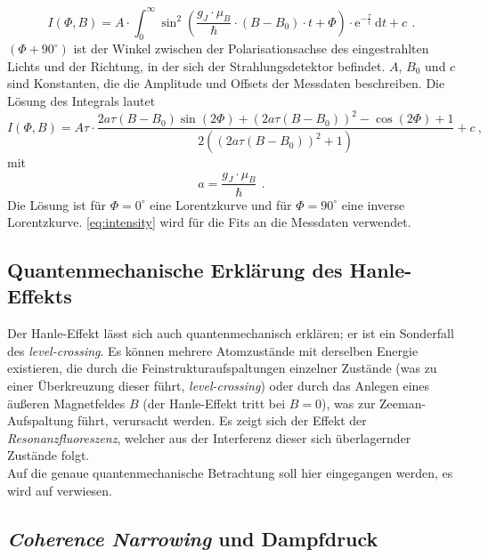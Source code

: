 \begin{equation}
\label{}
I(\Phi,B) = A \cdot \int_0^{\infty} \sin^2 \left( \frac{g_J \cdot \mu_B}{\hbar} \cdot (B-B_0) \cdot t + \Phi \right) \cdot
\text{e}^{-\frac{\tau}{t}} \ \text{d}t + c \, \ .
\end{equation}
$(\Phi + 90^{\circ})$ ist der Winkel zwischen der Polarisationsachse des eingestrahlten Lichts und der Richtung,
in der sich der Strahlungsdetektor befindet.
$A$, $B_0$ und $c$ sind Konstanten, die die Amplitude und Offsets der Messdaten beschreiben.
Die Lösung des Integrals lautet
\begin{equation}
\label{eq:intensity}
I(\Phi,B) = A \tau \cdot \frac{2 a \tau  (B-B_0) \sin (2 \Phi )+(2 a \tau  (B-B_0))^2-\cos (2 \Phi )+1}
{2 \left((2 a \tau  (B-B_0))^2+1\right)}+c \ ,
\end{equation}
mit
\begin{equation}
\label{}
a=\frac{g_J \cdot \mu_B}{\hbar} \, \ .
\end{equation}
Die Lösung ist für $\Phi=0^{\circ}$ eine Lorentzkurve und für $\Phi=90^{\circ}$ eine inverse Lorentzkurve.
\autoref{eq:intensity} wird für die Fits an die Messdaten verwendet.

\subsection{Quantenmechanische Erklärung des Hanle-Effekts}
Der Hanle-Effekt lässt sich auch quantenmechanisch erklären; er ist ein Sonderfall des \emph{level-crossing}. 
Es können mehrere Atomzustände mit derselben Energie existieren, die durch die Feinstrukturaufspaltungen einzelner Zustände (was zu einer Überkreuzung 
dieser führt, \emph{level-crossing}) oder durch das Anlegen eines äußeren Magnetfeldes $B$ (der Hanle-Effekt tritt bei $B=0$), was zur Zeeman-Aufspaltung 
führt, verursacht werden.
Es zeigt sich der Effekt der \emph{Resonanzfluoreszenz}, welcher aus der Interferenz dieser sich überlagernder Zustände folgt. \\
Auf die genaue quantenmechanische Betrachtung soll hier eingegangen werden, es wird auf \cite{manual} verwiesen.



\subsection{\emph{Coherence Narrowing} und Dampfdruck}

